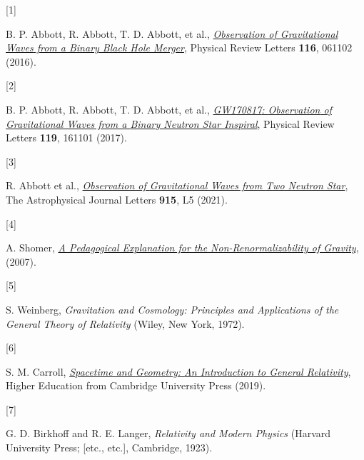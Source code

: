 \documentclass[
  10pt,
  a4paper,
  DIV=11,
  numbers=noendperiod,
  twoside]{scrreprt}
\newlength{\cslhangindent}
\newlength{\csllabelwidth}
\newlength{\cslentryspacingunit} %
\newenvironment{CSLReferences}[2] %
 {%
  \setlength{\parindent}{0pt}
  \ifodd #1
  \let\oldpar\par
  \def\par{\hangindent=\cslhangindent\oldpar}
  \fi
  \setlength{\parskip}{#2\cslentryspacingunit}
 }%
 {}
\newcommand{\CSLLeftMargin}[1]{\parbox[t]{\csllabelwidth}{#1}}
\newcommand{\CSLRightInline}[1]{\parbox[t]{\linewidth - \csllabelwidth}{#1}\break}
\DeclareRobustCommand{\[}{\begin{equation}}
\DeclareRobustCommand{\]}{\end{equation}}
\begin{document}
\hypertarget{refs}{}
\begin{CSLReferences}{0}{0}
\begin{figure}

\end{figure}

\leavevmode{}%
\CSLLeftMargin{{[}1{]} }%
\CSLRightInline{B. P. Abbott, R. Abbott, T. D. Abbott, et al.,
\emph{\href{https://doi.org/10.1103/PhysRevLett.116.061102}{Observation
of {Gravitational Waves} from a {Binary Black Hole Merger}}}, Physical
Review Letters \textbf{116}, 061102 (2016).}

\leavevmode{}%
\CSLLeftMargin{{[}2{]} }%
\CSLRightInline{B. P. Abbott, R. Abbott, T. D. Abbott, et al.,
\emph{\href{https://doi.org/10.1103/PhysRevLett.119.161101}{{GW170817}:
{Observation} of {Gravitational Waves} from a {Binary Neutron Star
Inspiral}}}, Physical Review Letters \textbf{119}, 161101 (2017).}

\leavevmode{}%
\CSLLeftMargin{{[}3{]} }%
\CSLRightInline{R. Abbott et al.,
\emph{\href{https://doi.org/10.3847/2041-8213/ac082e}{Observation of
{Gravitational Waves} from {Two Neutron
Star}\textendash{{Black Hole Coalescences}}}}, The Astrophysical Journal
Letters \textbf{915}, L5 (2021).}

\leavevmode{}%
\CSLLeftMargin{{[}4{]} }%
\CSLRightInline{A. Shomer,
\emph{\href{https://arxiv.org/abs/0709.3555}{A Pedagogical Explanation
for the Non-Renormalizability of Gravity}}, (2007).}

\leavevmode{}%
\CSLLeftMargin{{[}5{]} }%
\CSLRightInline{S. Weinberg, \emph{Gravitation and Cosmology: Principles
and Applications of the General Theory of Relativity} ({Wiley}, {New
York}, 1972).}

\leavevmode{}%
\CSLLeftMargin{{[}6{]} }%
\CSLRightInline{S. M. Carroll,
\emph{\href{https://doi.org/10.1017/9781108770385}{Spacetime and
{Geometry}: {An Introduction} to {General Relativity}}}, Higher
Education from Cambridge University Press (2019).}

\leavevmode{}%
\CSLLeftMargin{{[}7{]} }%
\CSLRightInline{G. D. Birkhoff and R. E. Langer, \emph{Relativity and
Modern Physics} ({Harvard University Press; {[}etc., etc.{]}},
{Cambridge}, 1923).}


\end{CSLReferences}
\end{document}
